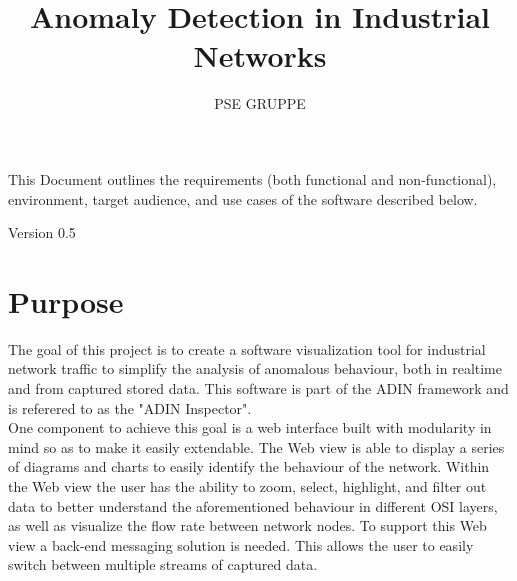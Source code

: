 \documentclass[twoside, english, draft]{Pflichtenheft}
\author{PSE GRUPPE}
\title{Anomaly Detection in Industrial Networks}
\begin{document}
\setpdf

\maketitle

 This Document outlines the requirements (both functional and non-functional), environment, target audience, and use cases of the software described below.


\hfill

\begin{center}
    \large{Version 0.5}
\end{center}



\thispagestyle{empty}
\newpage
\thispagestyle{empty}
\tableofcontents
\cleardoublepage
\setcounter{page}{1}


\section{Purpose}\label{sec:intro}
The goal of this project is to create a software visualization tool for industrial network traffic to simplify the analysis of anomalous behaviour, both in realtime and from captured stored data.
\newline
\newline
This software is part of the ADIN framework and is referered to as the "ADIN Inspector".
\\
One component to achieve this goal is a web interface built with modularity in mind so as to make it easily extendable.
\newline
\newline
The Web view is able to display a series of diagrams and charts to easily identify the behaviour of the network.
Within the Web view the user has the ability to zoom, select, highlight, and filter out data to better understand the aforementioned behaviour in different OSI layers, as well as visualize the flow rate between network nodes.
\newline
\newline
To support this Web view a back-end messaging solution is needed. This allows the user to easily switch between multiple streams of captured data.
\\
\end{document}
